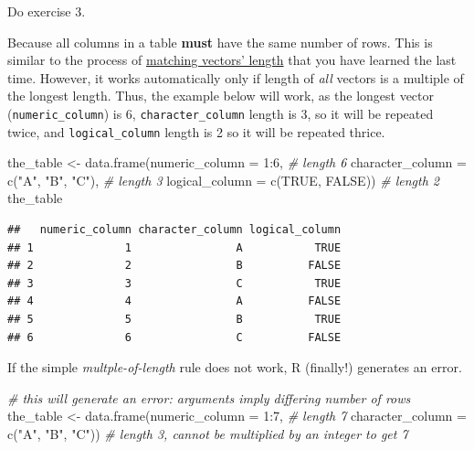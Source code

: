 \documentclass[
]{book}
\newenvironment{Shaded}{\begin{snugshade}}{\end{snugshade}}
\newcommand{\AttributeTok}[1]{\textcolor[rgb]{0.77,0.63,0.00}{#1}}
\newcommand{\CommentTok}[1]{\textcolor[rgb]{0.56,0.35,0.01}{\textit{#1}}}
\newcommand{\ConstantTok}[1]{\textcolor[rgb]{0.00,0.00,0.00}{#1}}
\newcommand{\DecValTok}[1]{\textcolor[rgb]{0.00,0.00,0.81}{#1}}
\newcommand{\FunctionTok}[1]{\textcolor[rgb]{0.00,0.00,0.00}{#1}}
\newcommand{\NormalTok}[1]{#1}
\newcommand{\OtherTok}[1]{\textcolor[rgb]{0.56,0.35,0.01}{#1}}
\newcommand{\SpecialCharTok}[1]{\textcolor[rgb]{0.00,0.00,0.00}{#1}}
\newcommand{\StringTok}[1]{\textcolor[rgb]{0.31,0.60,0.02}{#1}}
\begin{document}
Do exercise 3.

Because all columns in a table \textbf{must} have the same number of rows. This is similar to the process of \protect\hyperlink{different-length-vectors}{matching vectors' length} that you have learned the last time. However, it works automatically only if length of \emph{all} vectors is a multiple of the longest length. Thus, the example below will work, as the longest vector (\texttt{numeric\_column}) is 6, \texttt{character\_column} length is 3, so it will be repeated twice, and \texttt{logical\_column} length is 2 so it will be repeated thrice.

\begin{Shaded}
\begin{Highlighting}[]
\NormalTok{the\_table }\OtherTok{\textless{}{-}} \FunctionTok{data.frame}\NormalTok{(}\AttributeTok{numeric\_column =} \DecValTok{1}\SpecialCharTok{:}\DecValTok{6}\NormalTok{,                  }\CommentTok{\# length 6 }
                        \AttributeTok{character\_column =} \FunctionTok{c}\NormalTok{(}\StringTok{"A"}\NormalTok{, }\StringTok{"B"}\NormalTok{, }\StringTok{"C"}\NormalTok{),   }\CommentTok{\# length 3}
                        \AttributeTok{logical\_column =} \FunctionTok{c}\NormalTok{(}\ConstantTok{TRUE}\NormalTok{, }\ConstantTok{FALSE}\NormalTok{))       }\CommentTok{\# length 2}
\NormalTok{the\_table}
\end{Highlighting}
\end{Shaded}

\begin{verbatim}
##   numeric_column character_column logical_column
## 1              1                A           TRUE
## 2              2                B          FALSE
## 3              3                C           TRUE
## 4              4                A          FALSE
## 5              5                B           TRUE
## 6              6                C          FALSE
\end{verbatim}

If the simple \emph{multple-of-length} rule does not work, R (finally!) generates an error.

\begin{Shaded}
\begin{Highlighting}[]
\CommentTok{\# this will generate an error: arguments imply differing number of rows}
\NormalTok{the\_table }\OtherTok{\textless{}{-}} \FunctionTok{data.frame}\NormalTok{(}\AttributeTok{numeric\_column =} \DecValTok{1}\SpecialCharTok{:}\DecValTok{7}\NormalTok{,                 }\CommentTok{\# length 7}
                        \AttributeTok{character\_column =} \FunctionTok{c}\NormalTok{(}\StringTok{"A"}\NormalTok{, }\StringTok{"B"}\NormalTok{, }\StringTok{"C"}\NormalTok{))  }\CommentTok{\# length 3, cannot be multiplied by an integer to get 7}
\end{Highlighting}
\end{Shaded}
\end{document}

